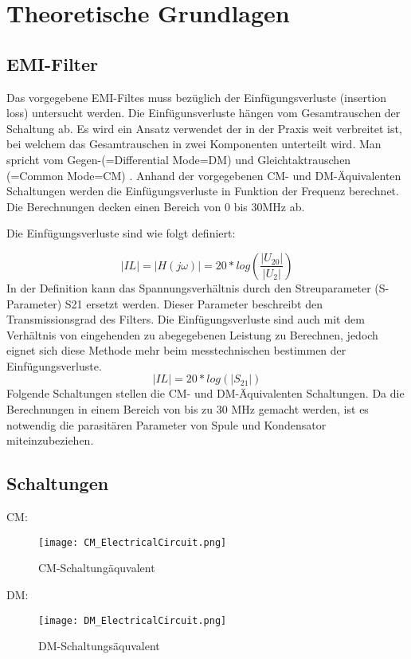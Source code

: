 \section{Theoretische Grundlagen} \label{sec:TheoretischeGrundlagen}

\subsection{EMI-Filter} \label{subsec:emifilter}
Das vorgegebene EMI-Filtes muss bezüglich der Einfügungsverluste (insertion loss) untersucht werden. Die Einfügunsverluste hängen vom Gesamtrauschen der Schaltung ab. Es wird ein Ansatz verwendet der in der Praxis weit verbreitet ist, bei welchem das Gesamtrauschen in zwei Komponenten unterteilt wird. Man spricht vom Gegen-(=Differential Mode=DM) und Gleichtaktrauschen (=Common Mode=CM) . Anhand der vorgegebenen CM- und DM-Äquivalenten Schaltungen werden die Einfügungsverluste in Funktion der Frequenz berechnet. Die Berechnungen decken einen Bereich von 0 bis 30MHz ab.

Die Einfügungsverluste sind wie folgt definiert: 

\begin{equation}
\left\lvert IL\right\rvert =\left\lvert H(j\omega) \right\rvert = 20*log(\frac{ \left\lvert U_{20} \right\rvert }{ \left\lvert U_2 \right\rvert })
\end{equation}
In der Definition kann das Spannungsverhältnis durch den Streuparameter (S-Parameter) S21 ersetzt werden. Dieser Parameter beschreibt den Transmissionsgrad des Filters. Die Einfügungsverluste sind auch mit dem Verhältnis von eingehenden zu abegegebenen Leistung zu Berechnen, jedoch eignet sich diese Methode mehr beim messtechnischen bestimmen der Einfügungsverluste. 
\begin{equation}
\left\lvert IL\right\rvert = 20*log (\left\lvert S_{21} \right\rvert)
\end{equation}
Folgende Schaltungen stellen die CM- und DM-Äquivalenten Schaltungen. Da die Berechnungen in einem Bereich von bis zu 30 MHz gemacht werden, ist es notwendig die parasitären Parameter von Spule und Kondensator miteinzubeziehen.
\subsection{Schaltungen} \label{subsec:schaltungen}
CM:
\begin{figure}[H]
	\centering
	\texttt{[image: CM\_ElectricalCircuit.png]}
	\caption{CM-Schaltungäquvalent}
	\label{fig:CM-Schaltungäquvalent}
\end{figure}
DM:
\begin{figure}[H]
	\centering
	\texttt{[image: DM\_ElectricalCircuit.png]}
	\caption{DM-Schaltungsäquvalent}
	\label{fig:DM-Schaltungsäquvalent}
\end{figure}

